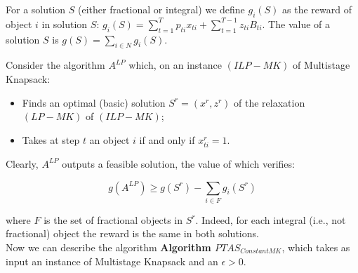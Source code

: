 \documentclass[a4paper]{book}
\begin{document}
For a solution $S$ (either fractional or integral) we define $g_i(S)$ as the reward of object $i$ in solution $S$: $g_i(S)=\sum_{t=1}^Tp_{ti}x_{ti}+\sum_{t=1}^{T-1}z_{ti}B_{ti}$. The value of a solution $S$ is $g(S)= \sum_{i\in N}g_i(S)$.


Consider the algorithm $A^{LP}$ which, on an instance $(ILP-MK)$ of {\sc Multistage Knapsack}:
\begin{itemize}
	\item Finds an optimal (basic) solution $S^r=(x^r,z^r)$ of the relaxation $(LP-MK)$ of $(ILP-MK)$;
	\item Takes at step $t$ an object $i$ if and only if $x^r_{ti}=1$.
\end{itemize}
Clearly, $A^{LP}$ outputs a feasible solution, the value of which verifies: 

\begin{equation}\label{eqlpr}
g(A^{LP})\geq g(S^r)-\sum_{i\in F} g_i(S^r)
\end{equation}

where $F$ is the set of fractional objects in $S^r$. Indeed, for each integral (i.e., not fractional) object the reward is the same in both solutions. \\

Now we can describe the algorithm \textbf{Algorithm $PTAS_{ConstantMK}$}, which takes as input an instance of {\sc Multistage  Knapsack} and an $\epsilon>0$.\\
\end{document}
